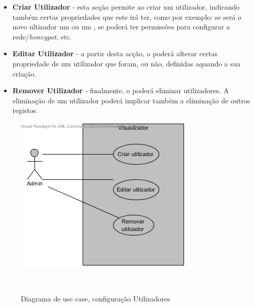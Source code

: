 \begin{itemize}
 \item \textbf{Criar Utilizador} - esta acção permite ao \admini criar um utilizador, indicando também certas propriedades que este irá ter, como por exemplo: se será o novo ultizador um \admini ou um \uticomum, se poderá ter permissões para configurar a rede/\emph{honeypot}, etc.
 \item \textbf{Editar Utilizador} - a partir desta acção, o \admini poderá alterar certas propriedade de um utilizador que foram, ou não, definidas aquando a sua criação.
 \item \textbf{Remover Utilizador} - finalmente, o \admini poderá eliminar utilizadores. A eliminação de um utilizador poderá implicar também a eliminação de outros registos.
\end{itemize}

\begin{figure}[!htb]
	\centering
	\includegraphics[scale=0.80]{images/ucs/ConfUtilizadores}
	\caption {Diagrama de use case, configuração Utilizadores}~\label{fig: confutil}
\end{figure}
\pagebreak

